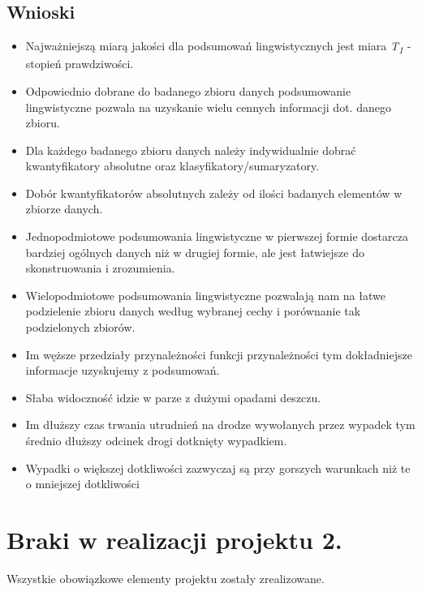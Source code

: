 \documentclass{classrep}
\begin{document}
\subsection{Wnioski}

\begin{itemize}
\item Najważniejszą miarą jakości dla podsumowań lingwistycznych jest miara \textit{T\textsubscript{1}} - stopień prawdziwości.
\item Odpowiednio dobrane do badanego zbioru danych podsumowanie lingwistyczne pozwala na uzyskanie wielu cennych informacji dot. danego zbioru.
\item Dla każdego badanego zbioru danych należy indywidualnie dobrać kwantyfikatory absolutne oraz klasyfikatory/sumaryzatory.
\item Dobór kwantyfikatorów absolutnych zależy od ilości badanych elementów w zbiorze danych.
\item Jednopodmiotowe podsumowania lingwistyczne w pierwszej formie dostarcza bardziej ogólnych danych niż w drugiej formie, ale jest łatwiejsze do skonstruowania i zrozumienia.
\item Wielopodmiotowe podsumowania lingwistyczne pozwalają nam na łatwe podzielenie zbioru danych według wybranej cechy i porównanie tak podzielonych zbiorów.
\item Im węższe przedziały przynależności funkcji przynależności tym dokładniejsze informacje uzyskujemy z podsumowań.
\item Słaba widoczność idzie w parze z dużymi opadami deszczu.
\item Im dłuższy czas trwania utrudnień na drodze wywołanych przez wypadek tym średnio dłuższy odcinek drogi dotknięty wypadkiem.
\item Wypadki o większej dotkliwości zazwyczaj są przy gorszych warunkach niż te o mniejszej dotkliwości
\end{itemize}



\section{Braki w realizacji projektu 2.}
Wszystkie obowiązkowe elementy projektu zostały zrealizowane.
\end{document}
